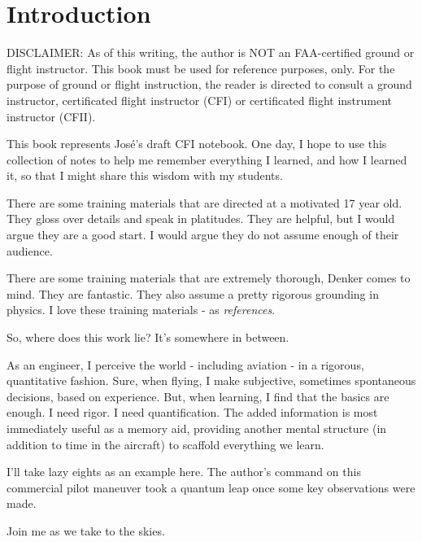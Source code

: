 \section*{Introduction}

DISCLAIMER: As of this writing, the author is NOT an FAA-certified ground or flight instructor. This book must be used for reference purposes, only. For the purpose of ground or flight instruction, the reader is directed to consult a ground instructor, certificated flight instructor (CFI) or certificated flight instrument instructor (CFII).

This book represents Jos\'e's draft CFI notebook. One day, I hope to use this collection of notes to help me remember everything I learned, and how I learned it, so that I might share this wisdom with my students.

There are some training materials that are directed at a motivated 17 year old. They gloss over details and speak in platitudes. They are helpful, but I would argue they are a good start. I would argue they do not assume enough of their audience.

There are some training materials that are extremely thorough, Denker \cite{denker} comes to mind. They are fantastic. They also assume a pretty rigorous grounding in physics. I love these training materials - as \emph{references}.

So, where does this work lie? It's somewhere in between.

As an engineer, I perceive the world - including aviation - in a rigorous, quantitative fashion. Sure, when flying, I make subjective, sometimes spontaneous decisions, based on experience. But, when learning, I find that the basics are enough. I need rigor. I need quantification. The added information is most immediately useful as a memory aid, providing another mental structure (in addition to time in the aircraft) to scaffold everything we learn.

I'll take lazy eights as an example here. The author's command on this commercial pilot maneuver took a quantum leap once some key observations were made.

Join me as we take to the skies.

